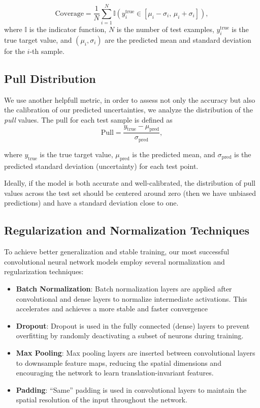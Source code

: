\begin{equation}
\mathrm{Coverage} = \frac{1}{N} \sum_{i=1}^N \mathbb{I} \left( y_i^\mathrm{true} \in [\mu_i - \sigma_i,\, \mu_i + \sigma_i] \right),
\end{equation}
where $\mathbb{I}$ is the indicator function, $N$ is the number of 
test examples, $y_i^\mathrm{true}$ is the true target value, 
and $(\mu_i, \sigma_i)$ are the predicted mean and standard deviation 
for the $i$-th sample.


\subsection{Pull Distribution}
\label{subsec:pull}

We use another helpfull metric, in order to assess not 
only the accuracy but also the calibration of our predicted 
uncertainties, we analyze the distribution of the \textit{pull} values. 
The pull for each test sample is defined as
\begin{equation}
\mathrm{Pull} = \frac{y_\mathrm{true} - \mu_\mathrm{pred}}{\sigma_\mathrm{pred}},
\end{equation}

where $y_\mathrm{true}$ is the true target value, 
$\mu_\mathrm{pred}$ is the predicted mean, 
and $\sigma_\mathrm{pred}$ is the predicted standard 
deviation (uncertainty) for each test point.

Ideally, if the model is both accurate and well-calibrated, 
the distribution of pull values across the test set should be 
centered around zero (then we have unbiased predictions) and have a standard 
deviation close to one.


\subsection{Regularization and Normalization Techniques}

To achieve better generalization and stable training, 
our most successful convolutional neural network models 
employ several normalization and regularization techniques:

\begin{itemize}
    \item \textbf{Batch Normalization}: Batch normalization layers are applied after convolutional 
    and dense layers to normalize intermediate activations. 
    This accelerates and achieves a more stable and faster convergence
    \item \textbf{Dropout}: Dropout is used in the fully connected (dense) layers to prevent overfitting 
    by randomly deactivating a subset of neurons during training.
    \item \textbf{Max Pooling}: Max pooling layers are inserted between convolutional layers to 
    downsample feature maps, reducing the spatial dimensions and encouraging the network to learn 
    translation-invariant features. 
    \item \textbf{Padding}: ``Same'' padding is used in convolutional layers to maintain the spatial 
    resolution of the input throughout the network.
\end{itemize}

